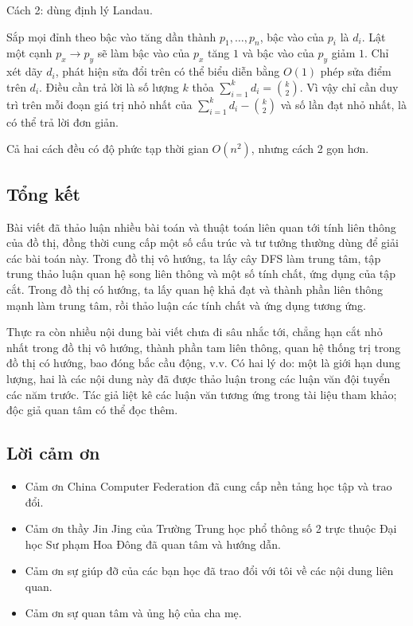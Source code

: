 \documentclass[11pt]{article}
\begin{document}
Cách 2: dùng định lý Landau.

Sắp mọi đỉnh theo bậc vào tăng dần thành $p_1,\ldots,p_n$, bậc vào của $p_i$ là
$d_i$. Lật một cạnh $p_x\to p_y$ sẽ làm bậc vào của $p_x$ tăng $1$ và bậc vào
của $p_y$ giảm $1$. Chỉ xét dãy $d_i$, phát hiện sửa đổi trên có thể biểu diễn
bằng $O(1)$ phép sửa điểm trên $d_i$. Điều cần trả lời là số lượng $k$ thỏa
$\sum_{i=1}^k d_i=\binom{k}{2}$. Vì vậy chỉ cần duy trì trên mỗi đoạn giá trị nhỏ
nhất của $\sum_{i=1}^k d_i-\binom{k}{2}$ và số lần đạt nhỏ nhất, là có thể trả
lời đơn giản.

Cả hai cách đều có độ phức tạp thời gian $O(n^2)$, nhưng cách 2 gọn hơn.

\subsection{Tổng kết}

Bài viết đã thảo luận nhiều bài toán và thuật toán liên quan tới tính liên thông
của đồ thị, đồng thời cung cấp một số cấu trúc và tư tưởng thường dùng để giải
các bài toán này. Trong đồ thị vô hướng, ta lấy cây DFS làm trung tâm, tập trung
thảo luận quan hệ song liên thông và một số tính chất, ứng dụng của tập cắt.
Trong đồ thị có hướng, ta lấy quan hệ khả đạt và thành phần liên thông mạnh làm
trung tâm, rồi thảo luận các tính chất và ứng dụng tương ứng.

Thực ra còn nhiều nội dung bài viết chưa đi sâu nhắc tới, chẳng hạn cắt nhỏ nhất
trong đồ thị vô hướng, thành phần tam liên thông, quan hệ thống trị trong đồ thị
có hướng, bao đóng bắc cầu động, v.v. Có hai lý do: một là giới hạn dung lượng,
hai là các nội dung này đã được thảo luận trong các luận văn đội tuyển các năm
trước. Tác giả liệt kê các luận văn tương ứng trong tài liệu tham khảo; độc giả
quan tâm có thể đọc thêm.

\subsection{Lời cảm ơn}

\begin{itemize}
  \item Cảm ơn China Computer Federation đã cung cấp nền tảng học tập và trao
  đổi.
  \item Cảm ơn thầy Jin Jing của Trường Trung học phổ thông số 2 trực thuộc Đại
  học Sư phạm Hoa Đông đã quan tâm và hướng dẫn.
  \item Cảm ơn sự giúp đỡ của các bạn học đã trao đổi với tôi về các nội dung
  liên quan.
  \item Cảm ơn sự quan tâm và ủng hộ của cha mẹ.
\end{itemize}
\end{document}
